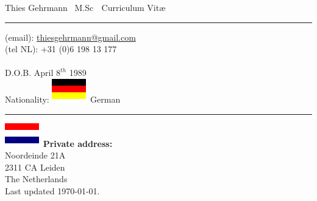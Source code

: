 \documentclass[letterpaper, 10pt]{article} %
\def\doctitle{\color{BrickRed}Curriculum Vit\ae}
\def\name{\color{MidnightBlue}Thies Gehrmann}
\def\maxdeg{\color{Black}M.Sc}
\begin{document}
\small

\pagestyle{plain}

\label{top}

{\huge {\textbf \name} {\footnotesize $\,$ \maxdeg} $\;$ {\textbf \doctitle} }
\vspace{0.1cm}
\hrule
\vspace{0.5cm}


\begin{minipage}[t]{0.50\textwidth}
  (email): \href{mailto:thiesgehrmann@gmail.com}{thiesgehrmann@gmail.com} \\
  (tel NL): +31 (0)6 198 13 177     \\
  \\
  D.O.B. April $8^{th}$ 1989 \\
  Nationality: \includegraphics[scale=0.4]{de.eps} German\\
  \hrule
  \vspace{5pt}

\end{minipage}
\hfill
\begin{minipage}[t]{0.30\textwidth}
  \includegraphics[scale=0.4]{nl.eps}
  \textbf{Private address:} \\
  Noordeinde 21A \\
  2311 CA Leiden \\
  The Netherlands \\

  Last updated \today.
\end{minipage}
\end{document}
